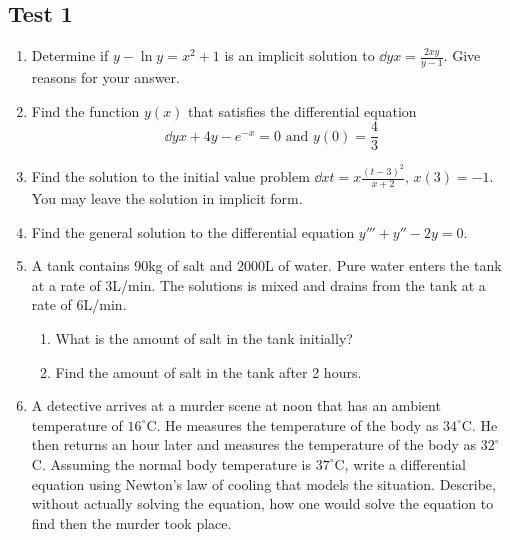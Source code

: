 \subsection{Test 1}

\begin{enumerate}[label=\arabic*.]
	\item 
		Determine if $y - \ln{y} = x^2 + 1$ is an implicit solution to $\dd{y}{x} = \frac{2xy}{y-1}$. Give reasons for your answer.
	\item 
		Find the function $y(x)$ that satisfies the differential equation
		\begin{equation*}
			\dd{y}{x} + 4y - e^{-x} = 0 \text{ and } y(0) = \frac{4}{3}
		\end{equation*}
	\item
		Find the solution to the initial value problem $\dd{x}{t} = x\frac{(t-3)^2}{x+2} \text{, } x(3) = -1$. You may leave the solution in implicit form.
	\item
		Find the general solution to the differential equation $y''' + y'' - 2y = 0$.
	\item
		A tank contains 90kg of salt and 2000L of water. Pure water enters the tank at a rate of 3L/min. The solutions is mixed and drains from the tank at a rate of 6L/min.
		\begin{enumerate}[label=(\alph*)]
			\item
				What is the amount of salt in the tank initially?
			\item 
				Find the amount of salt in the tank after 2 hours.
		\end{enumerate}
	\item
		A detective arrives at a murder scene at noon that has an ambient temperature of $16^{\circ}$C. He measures the temperature of the body as $34^{\circ}$C. He then returns an hour later and measures the temperature of the body as $32^{\circ}$C.
		Assuming the normal body temperature is $37^{\circ}$C, write a differential equation using Newton's law of cooling that models the situation. Describe, without actually solving the equation, how one would solve the equation to find then the murder took place.
\end{enumerate}